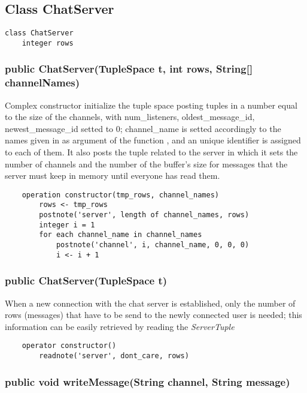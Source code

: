 \documentclass[10pt,a4paper]{article}
\begin{document}
\subsection{Class ChatServer}

\begin{verbatim}
class ChatServer
	integer rows
\end{verbatim}

\subsubsection{public ChatServer(TupleSpace t, int rows, String[] channelNames)}

Complex constructor initialize the tuple space posting tuples in a number equal to the size of the channels, with num_listeners, oldest_message_id, newest_message_id setted to 0; channel_name is setted accordingly to the names given in as argument of the function , and an unique identifier is assigned to each of them.
It also posts the tuple related to the server in which it sets the number of channels and the number of the buffer's size for messages that the server must keep in memory until everyone has read them.

\begin{verbatim}
	operation constructor(tmp_rows, channel_names)
		rows <- tmp_rows
		postnote('server', length of channel_names, rows)
		integer i = 1
		for each channel_name in channel_names
			postnote('channel', i, channel_name, 0, 0, 0)
			i <- i + 1
\end{verbatim}

\subsubsection{public ChatServer(TupleSpace t)}

When a new connection with the chat server is established, only the number of rows (messages) that have to be send to the newly connected user is needed; this information can be easily retrieved by reading the \textit{ServerTuple} 

\begin{verbatim}
	operator constructor()
		readnote('server', dont_care, rows)
\end{verbatim}

\subsubsection{public void writeMessage(String channel, String message)}
\end{document}
